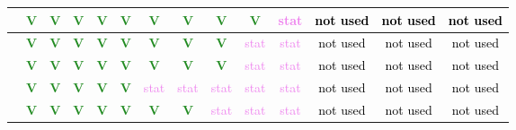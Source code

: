 \begin{frame}
{\begin{tabular}{|c||*{13}{c|}}
\hline
[283-344] & \textcolor{ForestGreen}{\textbf{V}} & \textcolor{ForestGreen}{\textbf{V}} & \textcolor{ForestGreen}{\textbf{V}} & \textcolor{ForestGreen}{\textbf{V}} & \textcolor{ForestGreen}{\textbf{V}} & \textcolor{ForestGreen}{\textbf{V}} & \textcolor{ForestGreen}{\textbf{V}} & \textcolor{ForestGreen}{\textbf{V}} & \textcolor{ForestGreen}{\textbf{V}} & \textcolor{violet}{stat} & \textcolor{black}{not used} & \textcolor{black}{not used} & \textcolor{black}{not used} \\
\hline
[344-443] & \textcolor{ForestGreen}{\textbf{V}} & \textcolor{ForestGreen}{\textbf{V}} & \textcolor{ForestGreen}{\textbf{V}} & \textcolor{ForestGreen}{\textbf{V}} & \textcolor{ForestGreen}{\textbf{V}} & \textcolor{ForestGreen}{\textbf{V}} & \textcolor{ForestGreen}{\textbf{V}} & \textcolor{ForestGreen}{\textbf{V}} & \textcolor{violet}{stat} & \textcolor{violet}{stat} & \textcolor{black}{not used} & \textcolor{black}{not used} & \textcolor{black}{not used} \\
\hline
[443-577] & \textcolor{ForestGreen}{\textbf{V}} & \textcolor{ForestGreen}{\textbf{V}} & \textcolor{ForestGreen}{\textbf{V}} & \textcolor{ForestGreen}{\textbf{V}} & \textcolor{ForestGreen}{\textbf{V}} & \textcolor{ForestGreen}{\textbf{V}} & \textcolor{ForestGreen}{\textbf{V}} & \textcolor{ForestGreen}{\textbf{V}} & \textcolor{violet}{stat} & \textcolor{violet}{stat} & \textcolor{black}{not used} & \textcolor{black}{not used} & \textcolor{black}{not used} \\
\hline
[577-606] & \textcolor{ForestGreen}{\textbf{V}} & \textcolor{ForestGreen}{\textbf{V}} & \textcolor{ForestGreen}{\textbf{V}} & \textcolor{ForestGreen}{\textbf{V}} & \textcolor{ForestGreen}{\textbf{V}} & \textcolor{violet}{stat} & \textcolor{violet}{stat} & \textcolor{violet}{stat} & \textcolor{violet}{stat} & \textcolor{violet}{stat} & \textcolor{black}{not used} & \textcolor{black}{not used} & \textcolor{black}{not used} \\
\hline
[606-1500] & \textcolor{ForestGreen}{\textbf{V}} & \textcolor{ForestGreen}{\textbf{V}} & \textcolor{ForestGreen}{\textbf{V}} & \textcolor{ForestGreen}{\textbf{V}} & \textcolor{ForestGreen}{\textbf{V}} & \textcolor{ForestGreen}{\textbf{V}} & \textcolor{ForestGreen}{\textbf{V}} & \textcolor{violet}{stat} & \textcolor{violet}{stat} & \textcolor{violet}{stat} & \textcolor{black}{not used} & \textcolor{black}{not used} & \textcolor{black}{not used} \\
\hline
\end{tabular}
}
\vspace{0.5cm}


\end{frame}
